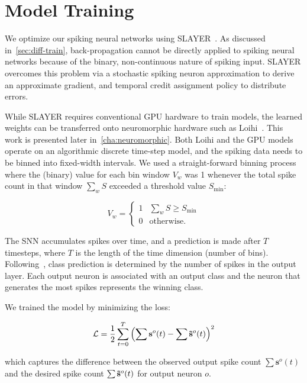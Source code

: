\documentclass[fyp]{socreport}
\begin{document}
\section{Model Training\label{sec:model-training}}

We optimize our spiking neural networks using SLAYER~\cite{NIPS2018_7415}. As
discussed in~\autoref{sec:diff-train}, back-propagation cannot be directly
applied to spiking neural networks because of the binary, non-continuous nature
of spiking input. SLAYER overcomes this problem via a stochastic spiking neuron
approximation to derive an approximate gradient, and temporal credit assignment
policy to distribute errors.

While SLAYER requires conventional GPU hardware to train models, the learned
weights can be transferred onto neuromorphic hardware such as
Loihi~\cite{davies2018loihi}. This work is presented later
in~\autoref{cha:neuromorphic}. Both Loihi and the GPU models operate on an
algorithmic discrete time-step model, and the spiking data needs to be binned
into fixed-width intervals. We used a straight-forward binning process where the
(binary) value for each bin window $V_{w}$ was 1 whenever the total spike count
in that window $\sum_{w} S$ exceeded a threshold value $S_{\text{min}}$:

\begin{equation} \label{eqn:bin}
  V_w = \begin{cases}
    1 & \sum_{w} S \ge S_\min \\
    0 & \text{otherwise.}
  \end{cases}
\end{equation}

The SNN accumulates spikes over time, and a prediction is made after $T$
timesteps, where $T$ is the length of the time dimension (number of bins).
Following~\cite{NIPS2018_7415}, class prediction is determined by the number of
spikes in the output layer. Each output neuron is associated with an output
class and the neuron that generates the most spikes represents the winning
class.

We trained the model by minimizing the loss:

\begin{align}
  \mathcal{L} = \frac{1}{2} \sum_{t=0}^T \left( \sum \mathbf{s}^o(t) - \sum \mathbf{\Tilde{s}}^o(t) \right)^2
\end{align}

which captures the difference between the observed output spike count
$\sum \mathbf{s}^o(t)$ and the desired spike count
$\sum \mathbf{\Tilde{s}}^o(t)$ for output neuron $o$.
\end{document}
